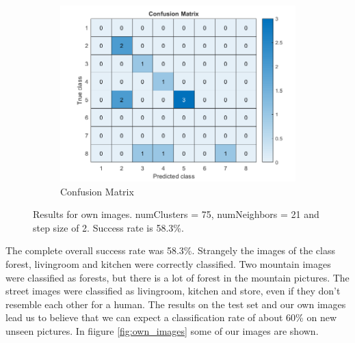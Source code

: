 \begin{figure}[h]
\begin{subfigure}{0.3\textwidth}
	\end{subfigure}
	\begin{subfigure}{0.65\textwidth}
		\includegraphics[width=\textwidth]{figures/own_confusion.png}
		\caption{Confusion Matrix}
	\end{subfigure}

	\caption{Results for own images. numClusters = 75, numNeighbors = 21 and step size of 2. Success rate is 58.3\%.}
	\label{fig:own_classification_results}
\end{figure}
The complete overall success rate was 58.3\%. Strangely the images of the class forest, livingroom and kitchen were correctly classified. Two mountain images were classified as forests, but there is a lot of forest in the mountain pictures. The street images were classified as livingroom, kitchen and store, even if they don't resemble each other for a human. The results on the test set and our own images lead us to believe that we can expect a classification rate of about 60\% on new unseen pictures. In fiigure \ref{fig:own_images} some of our images are shown.
